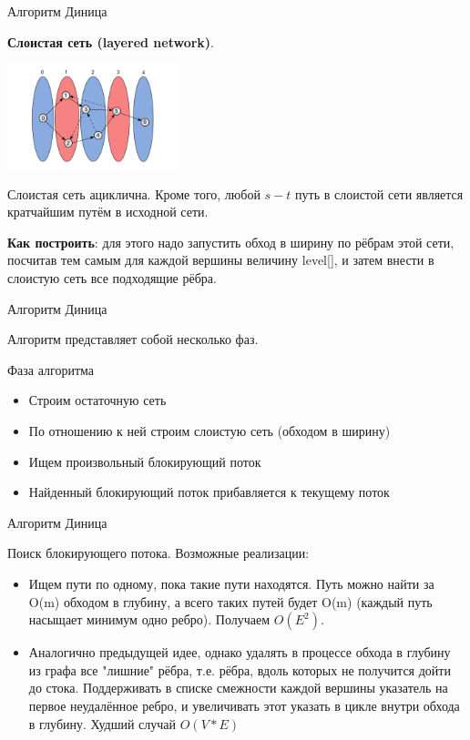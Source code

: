\documentclass[10pt]{beamer}
\begin{document}
\begin{frame}[fragile]{Алгоритм Диница}

\textbf{Слоистая сеть (layered network)}. 

\begin{center}
    \includegraphics[width=5cm]{Term_2/Source/images/8-layered-network.png}
\end{center}

Слоистая сеть ациклична. Кроме того, любой $s-t$ путь в слоистой сети является кратчайшим путём в исходной сети.

\textbf{Как построить}: для этого надо запустить обход в ширину по рёбрам этой сети, посчитав тем самым для каждой вершины величину {\rm level}[], и затем внести в слоистую сеть все подходящие рёбра.

\end{frame}

\begin{frame}[fragile]{Алгоритм Диница}

Алгоритм представляет собой несколько фаз. 

Фаза алгоритма 

\begin{itemize}
    \item Строим остаточную сеть
    \item По отношению к ней строим слоистую сеть (обходом в ширину)
    \item Ищем произвольный блокирующий поток
    \item Найденный блокирующий поток прибавляется к текущему поток
\end{itemize}

\end{frame}

\begin{frame}[fragile]{Алгоритм Диница}

Поиск блокирующего потока. Возможные реализации:

\begin{itemize}
    \item Ищем пути по одному, пока такие пути находятся. Путь можно найти за O(m) обходом в глубину, а всего таких путей будет O(m) (каждый путь насыщает минимум одно ребро). Получаем $O(E^2)$.
    \item Аналогично предыдущей идее, однако удалять в процессе обхода в глубину из графа все "лишние" рёбра, т.е. рёбра, вдоль которых не получится дойти до стока. Поддерживать в списке смежности каждой вершины указатель на первое неудалённое ребро, и увеличивать этот указать в цикле внутри обхода в глубину. Худший случай $O(V*E)$
\end{itemize}

\end{frame}
\end{document}
